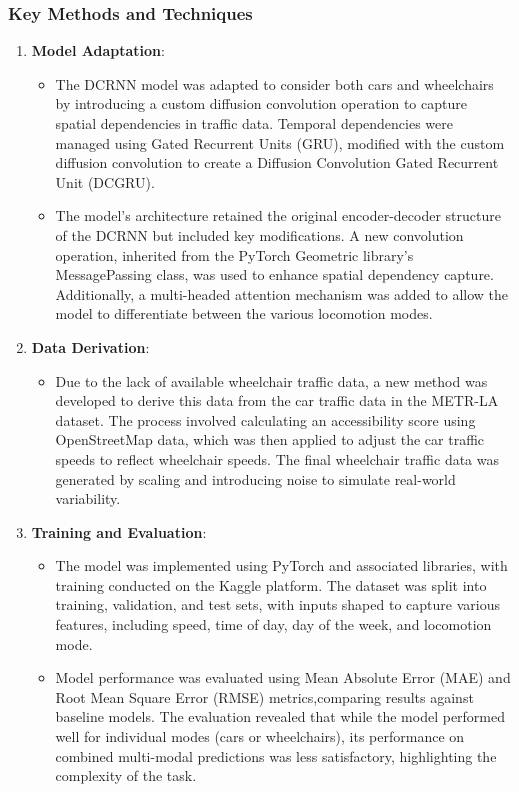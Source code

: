 \subsubsection{Key Methods and Techniques}\label{subsubsec:key-methods-and-techniques}
\begin{enumerate}
    \item \textbf{Model Adaptation}:
    \begin{itemize}
        \item
        The DCRNN model was adapted to consider both cars and wheelchairs by introducing a custom diffusion convolution
        operation to capture spatial dependencies in traffic data.
        Temporal dependencies were managed using Gated Recurrent Units (GRU), modified with the custom diffusion
        convolution to create a Diffusion Convolution Gated Recurrent Unit (DCGRU).
        \item
        The model's architecture retained the original encoder-decoder structure of the DCRNN but included key
        modifications.
        A new convolution operation, inherited from the PyTorch Geometric library's MessagePassing class, was used to
        enhance spatial dependency capture.
        Additionally, a multi-headed attention mechanism was added to allow the model to differentiate between the
        various locomotion modes.
    \end{itemize}

    \item \textbf{Data Derivation}:
    \begin{itemize}
        \item
        Due to the lack of available wheelchair traffic data, a new method was developed to derive this data from the
        car traffic data in the METR-LA dataset.
        The process involved calculating an accessibility score using OpenStreetMap data, which was then applied to
        adjust the car traffic speeds to reflect wheelchair speeds.
        The final wheelchair traffic data was generated by scaling and introducing noise to simulate real-world
        variability.
    \end{itemize}

    \item \textbf{Training and Evaluation}:
    \begin{itemize}
        \item
        The model was implemented using PyTorch and associated libraries, with training conducted on the Kaggle
        platform.
        The dataset was split into training, validation, and test sets, with inputs shaped to capture various features,
        including speed, time of day, day of the week, and locomotion mode.
        \item
        Model performance was evaluated using Mean Absolute Error (MAE) and Root Mean Square Error (RMSE)
        metrics,comparing results against baseline models.
        The evaluation revealed that while the model performed well for individual modes (cars or wheelchairs), its
        performance on combined multi-modal predictions was less satisfactory, highlighting the complexity of the task.
    \end{itemize}
\end{enumerate}

